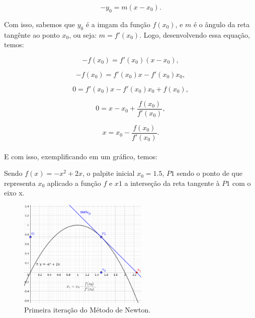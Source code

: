 \begin{equation}
    -y_0=m(x-x_0).
\end{equation}

Com isso, sabemos que $y_0$ é a imgam da função $f(x_0)$, e $m$ é o ângulo da
reta tangênte ao ponto $x_0$, ou seja: $m=f'(x_0)$. Logo, desenvolvendo essa
equação, temos:

\begin{equation}
    -f(x_0) = f'(x_0)(x-x_0),
\end{equation}

\begin{equation}
    -f(x_0) = f'(x_0)x - f'(x_0)x_0,
\end{equation}

\begin{equation}
    0 = f'(x_0)x - f'(x_0)x_0+f(x_0),
\end{equation}

\begin{equation}
    0 = x - x_0 + \frac{f(x_0)}{f'(x_0)},
\end{equation}

\begin{equation}
    x = x_0 - \frac {f(x_0)}{f'(x_0)}.
\end{equation}\\

E com isso, exemplificando em um gráfico, temos:

Sendo $f(x)=-x^2+2x$, o palpite inicial $x_0=1.5$, $P1$ sendo o ponto de que
representa $x_0$ aplicado a função $f$ e $x1$ a interseção da reta tangente à
$P1$ com o eixo x.

\begin{figure}[ht]
    \includegraphics[width=0.55\textwidth]
      {src/MetodoNewton_grafico_1.png}
    \centering
    \caption{
      \centering
      Primeira iteração do Método de Newton.
    }
    \label{MetodoNewton_grafico_1}
\end{figure}


